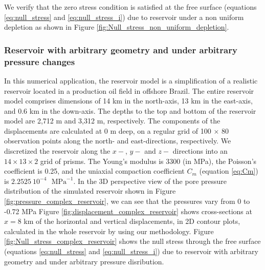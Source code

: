 \documentclass[journal abbreviation, manuscript]{copernicus}
\begin{document}
We verify that the zero stress condition is satisfied at the free surface (equations \ref{eq:null_stress} and \ref{eq:null_stress_i}) due to reservoir under a non uniform depletion as shown in Figure \ref{fig:Null_stress_non_uniform_depletion}.

\subsubsection{Reservoir with arbitrary geometry and under arbitrary pressure changes}

In this numerical application, the reservoir model is a simplification of a realistic reservoir located in a production oil field in offshore Brazil.
The entire reservoir model comprises dimensions of 14 km in the north-axis, 13 km in the
east-axis, and 0.6 km in the down-axis. 
The depths to the top and bottom of the reservoir model are 2,712 m and 3,312 m, respectively. 
The components of the displacements are calculated at 0 m deep, 
on a regular grid of 100 $\times$ 80  observation points along the north- and east-directions, respectively. 
We  discretized the reservoir  along the $x-$, $y-$ and $z-$ directions into an $14 \times 13 \times 2$ grid of prisms.
The Young’s modulus is  3300 (in MPa), the Poisson's coefficient is 0.25, and
the uniaxial compaction coefficient $C_{m}$  (equation \ref{eq:Cm}) is $2.2525 \: 10^{-4}$
$\textrm{ MPa}^{-1}$.
In the 3D perspective view of the pore pressure distribution of the simulated reservoir shown in Figure \ref{fig:pressure_complex_reservoir}, we can see that the pressures vary from 0 to -0.72 MPa
Figure \ref{fig:displacement_complex_reservoir} shows cross-sections at $x  = 8$ km of the horizontal and vertical displacements, in 2D contour plots, calculated in the whole reservoir by using our methodology.
Figure \ref{fig:Null_stress_complex_reservoir} shows the  null stress through the free surface (equations \ref{eq:null_stress} and \ref{eq:null_stress_i}) due to reservoir with arbitrary geometry and under arbitrary pressure disribution.
\end{document}
